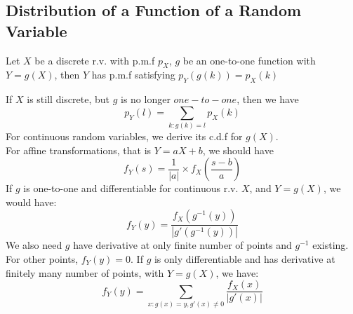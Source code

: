 \subsection{Distribution of a Function of a Random Variable}
\begin{theorem}
    Let $X$ be a discrete r.v. with p.m.f $p_X$, $g$ be an one-to-one function with $Y = g(X)$, then $Y$ has p.m.f satisfying $p_Y(g(k)) = p_X(k)$
\end{theorem}
If $X$ is still discrete, but $g$ is no longer $one-to-one$, then we have
$$p_Y(l) = \sum_{k: g(k) = l} p_X(k)$$
For continuous random variables, we derive its c.d.f for $g(X)$. \\
For affine transformations, that is $Y = aX + b$, we should have
$$f_Y(s) = \frac{1}{|a|} \times f_X(\frac{s - b}{a})$$
If $g$ is one-to-one and differentiable for continuous r.v. $X$, and $Y = g(X)$, we would have:
$$f_Y(y) = \frac{f_X(g^{-1}(y))}{|g'(g^{-1}(y))|}$$
We also need $g$ have derivative at only finite number of points and $g^{-1}$ existing. For other points, $f_Y(y) = 0$.
If $g$ is only differentiable and has derivative at finitely many number of points, with $Y = g(X)$, we have:
$$f_Y(y) = \sum_{x: g(x) = y, g'(x) \ne 0} \frac{f_X(x)}{|g'(x)|}$$

\newpage